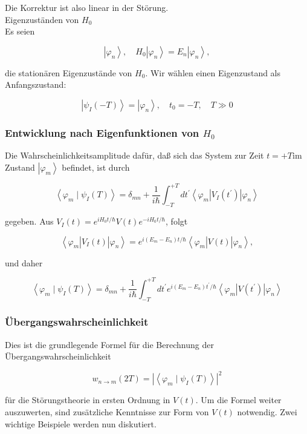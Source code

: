 \documentclass[10pt, letterpaper]{article}
\begin{document}
Die Korrektur ist also linear in der Störung.\\
Eigenzuständen von $H_{0}$\\
Es seien

$$
\left|\varphi_{n}\right\rangle, \quad H_{0}\left|\varphi_{n}\right\rangle=E_{n}\left|\varphi_{n}\right\rangle,
$$

die stationären Eigenzustände von $H_{0}$. Wir wählen einen Eigenzustand als Anfangszustand:

$$
\left|\psi_{I}(-T)\right\rangle=\left|\varphi_{n}\right\rangle, \quad t_{0}=-T, \quad T \gg 0
$$

\subsubsection*{Entwicklung nach Eigenfunktionen von $H_{0}$}
Die Wahrscheinlichkeitsamplitude dafür, daß sich das System zur Zeit $t=+T \mathrm{im}$ Zustand $\left|\varphi_{m}\right\rangle$ befindet, ist durch

$$
\left\langle\varphi_{m} \mid \psi_{I}(T)\right\rangle=\delta_{m n}+\frac{1}{i \hbar} \int_{-T}^{+T} d t^{\prime}\left\langle\varphi_{m}\right| V_{I}\left(t^{\prime}\right)\left|\varphi_{n}\right\rangle
$$

gegeben. Aus $V_{I}(t)=e^{i H_{0} t / \hbar} V(t) e^{-i H_{0} t / \hbar}$, folgt

$$
\left\langle\varphi_{m}\right| V_{I}(t)\left|\varphi_{n}\right\rangle=e^{i\left(E_{m}-E_{n}\right) t / \hbar}\left\langle\varphi_{m}\right| V(t)\left|\varphi_{n}\right\rangle,
$$

und daher

$$
\left\langle\varphi_{m} \mid \psi_{I}(T)\right\rangle=\delta_{m n}+\frac{1}{i \hbar} \int_{-T}^{+T} d t^{\prime} e^{i\left(E_{m}-E_{n}\right) t^{\prime} / \hbar}\left\langle\varphi_{m}\right| V\left(t^{\prime}\right)\left|\varphi_{n}\right\rangle
$$

\subsubsection*{Übergangswahrscheinlichkeit}
Dies ist die grundlegende Formel für die Berechnung der Übergangswahrscheinlichkeit

$$
w_{n \rightarrow m}(2 T)=\left|\left\langle\varphi_{m} \mid \psi_{I}(T)\right\rangle\right|^{2}
$$

für die Störungstheorie in ersten Ordnung in $V(t)$. Um die Formel weiter auszuwerten, sind zusätzliche Kenntnisse zur Form von $V(t)$ notwendig. Zwei wichtige Beispiele werden nun diskutiert.
\end{document}
